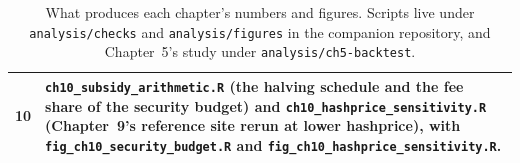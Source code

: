 \begin{table}[htbp]
\begin{tabular}{@{}p{11mm}p{88mm}@{}}
    10 & \texttt{ch10\_subsidy\_arithmetic.R} (the halving schedule and the fee
        share of the security budget) and \texttt{ch10\_hashprice\_sensitivity.R}
        (Chapter~9's reference site rerun at lower hashprice), with
        \texttt{fig\_ch10\_security\_budget.R} and
        \texttt{fig\_ch10\_hashprice\_sensitivity.R}. \\
    \hline
  \end{tabular}
  \caption{What produces each chapter's numbers and figures. Scripts live under
  \texttt{analysis/checks} and \texttt{analysis/figures} in the companion
  repository, and Chapter~5's study under \texttt{analysis/ch5-backtest}.} %
  \label{tab:appendix-scripts}
\end{table}


